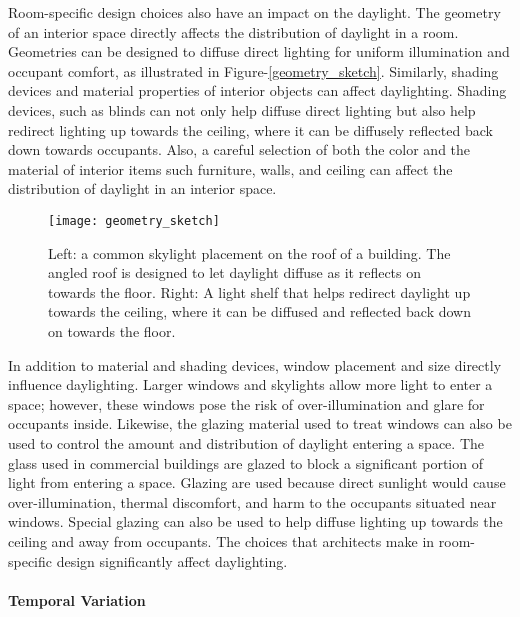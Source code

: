     Room-specific design choices also have an impact on the daylight.
    The geometry of an interior space directly affects the distribution of daylight in a room.
    Geometries can be designed to diffuse direct lighting for uniform illumination and occupant comfort, as illustrated in Figure-\ref{geometry_sketch}.
    Similarly, shading devices and material properties of interior objects can affect daylighting.
    Shading devices, such as blinds can not only help diffuse direct lighting but also help redirect lighting up towards the ceiling, where it can be diffusely reflected back down towards occupants.
    Also, a careful selection of both the color and the material of interior items such furniture, walls, and ceiling can affect the distribution of daylight in an interior space. 

    \begin{figure}[h]
      \centering
      \caption[Daylight distribution with varying architectural geometries.]{Left: a common skylight placement on the roof of a building. The angled roof is designed to let daylight diffuse as it reflects on towards the floor. Right: A light shelf that helps redirect daylight up towards the ceiling, where it can be diffused and reflected back down on towards the floor.}
      \label{fig:geometry_sketch}
      \texttt{[image: geometry\_sketch]}
    \end{figure}

    In addition to material and shading devices, window placement and size directly influence daylighting.
    Larger windows and skylights allow more light to enter a space; however, these windows pose the risk of over-illumination and glare for occupants inside.
    Likewise, the glazing material used to treat windows can also be used to control the amount and distribution of daylight entering a space.
    The glass used in commercial buildings are glazed to block a significant portion of light from entering a space.
    Glazing are used because direct sunlight would cause over-illumination, thermal discomfort, and harm to the occupants situated near windows.
    Special glazing can also be used to help diffuse lighting up towards the ceiling and away from occupants.
    The choices that architects make in room-specific design significantly affect daylighting.\\

    \paragraph{Temporal Variation} 

